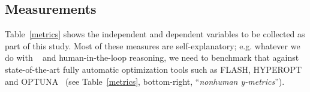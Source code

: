 
 


 




\subsection{Measurements}
{\noindent}Table~\ref{metrics} shows the   independent and dependent variables to be collected as part of this study.  Most of these measures are self-explanatory; e.g. whatever we do with \IT~  and human-in-the-loop reasoning, we need to benchmark that against state-of-the-art fully automatic optimization tools such as FLASH, HYPEROPT and OPTUNA~\cite{bergstra2015hyperopt,nair18,akiba2019optuna} (see Table~\ref{metrics}, bottom-right, ``{\em nonhuman y-metrics}'').

